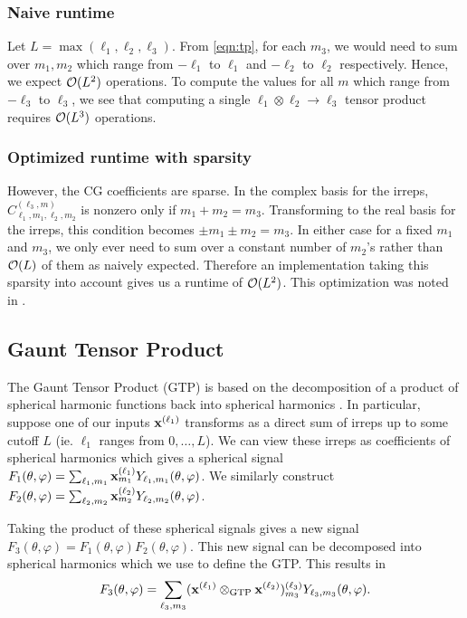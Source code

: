 \subsubsection{Naive runtime}
Let $L=\max(\ell_1,\ell_2,\ell_3)$.
From \autoref{eqn:tp}, for each $m_3$, we would need to sum over $m_1,m_2$ which range from $-\ell_1$ to $\ell_1$ and $-\ell_2$ to $\ell_2$ respectively. Hence, we expect $\mathcal{O}(L^2)$ operations. To compute the values for all $m$ which range from $-\ell_3$ to $\ell_3$, we see that computing a single $\ell_1\otimes\ell_2\to\ell_3$ tensor product requires $\mathcal{O}(L^3)$ operations.

\subsubsection{Optimized runtime with sparsity}
However, the CG coefficients are sparse. In the complex basis for the irreps, $C^{(\ell_3,m)}_{\ell_1,m_1,\ell_2,m_2}$ is nonzero only if $m_1+m_2=m_3$. Transforming to the real basis for the irreps, this condition becomes $\pm m_1\pm m_2=m_3$. In either case for a fixed $m_1$ and $m_3$, we only ever need to sum over a constant number of $m_2$'s rather than $\mathcal{O}(L)$ of them as naively expected. Therefore an implementation taking this sparsity into account gives us a runtime of $\mathcal{O}(L^2)$. This optimization was noted in \citet{cobbefficient}.


\subsection{Gaunt Tensor Product}
\label{sec:GTP_runtimes}
The Gaunt Tensor Product (GTP) is based on the decomposition of a product of spherical harmonic functions back into spherical harmonics \cite{gaunt}. In particular, suppose one of our inputs $\mathbf{x}^{(\ell_{1})}$ transforms as a direct sum of irreps up to some cutoff $L$ (ie. $\ell_1$ ranges from $0,\ldots,L$). We can view these irreps as coefficients of spherical harmonics which gives a spherical signal $F_1(\theta,\varphi)=\sum_{\ell_1,m_1}\mathbf{x}^{(\ell_{1})}_{m_1}Y_{\ell_1,m_1}(\theta,\varphi)$. We similarly construct $F_2(\theta,\varphi)=\sum_{\ell_2,m_2}\mathbf{x}^{(\ell_{2})}_{m_2}Y_{\ell_2,m_2}(\theta,\varphi)$.

Taking the product of these spherical signals gives a new signal $F_3(\theta,\varphi)=F_1(\theta,\varphi)F_2(\theta,\varphi)$. This new signal can be decomposed into spherical harmonics which we use to define the GTP. This results in
\begin{align}
F_3(\theta,\varphi)=\sum_{\ell_3,m_3}(\mathbf{x}^{(\ell_{1})} \otimes_{\mathrm{GTP}} \mathbf{x}^{(\ell_{2})})^{(\ell_3)}_{m_3}Y_{\ell_3,m_3}(\theta,\varphi).\end{align}



